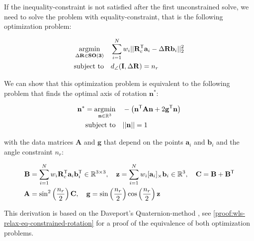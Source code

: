 If the inequality-constraint is not satisfied after the first unconstrained solve, we need to solve the problem with equality-constraint, that is the following optimization problem: 

\begin{equation}
	\label{eq:tls-rwls-eq}
	\begin{aligned}
		\operatorname*{argmin}_{\Delta \mathbf{R} \in \mathbf{SO(3)}}  \quad &\sum_{i=1}^{N} w_i ||\mathbf{R}_c^{\mathsf{T}} \mathbf{a}_i - \Delta\mathbf{R} \mathbf{b}_i ||_2^2 \\
		\text{subject to} \quad &d_{\angle}(\mathbf{I}, \Delta\mathbf{R}) = n_r
	\end{aligned}
\end{equation}

We can show that this optimization problem is equivalent to the following problem that finds the optimal axis of rotation $\mathbf{n}^*$:

\begin{equation}
	\begin{aligned}
		\label{eq:eq-constrained-prob-ev}
		\mathbf{n}^* = \operatorname*{argmin}_{\mathbf{n} \in \mathbb{R}^3} \quad &-\left(\mathbf{n}^{\mathsf{T}} \mathbf{A} \mathbf{n} + 2 \mathbf{g}^{\mathsf{T}} \mathbf{n} \right)\\
		\text{subject to} \quad &|| \mathbf{n}|| = 1\\
	\end{aligned}
\end{equation}

with the data matrices $\mathbf{A}$ and $\mathbf{g}$ that depend on the points $\mathbf{a}_i$ and $\mathbf{b}_i$ and the angle constraint $n_r$:

\begin{equation}
	\label{eq:davenport-data-matrices}
	\begin{aligned}
		\mathbf{B} &= \sum_{i=1}^N w_i \mathbf{R}_c^{\mathsf{T}} \mathbf{a}_i\mathbf{b}_i^{\mathsf{T}} \in \mathbb{R}^{3 \times 3}, \quad
		\mathbf{z} = \sum_{i=1}^N w_i [\mathbf{a}_i]_{\times}\mathbf{b}_i \in \mathbb{R}^{3}, \quad \mathbf{C} = \mathbf{B} + \mathbf{B}^{\mathsf{T}}\\
		\mathbf{A} &= \sin^2 \left(\frac{n_r}{2} \right) \mathbf{C}, \quad \mathbf{g} =  \sin \left(\frac{n_r}{2} \right) \cos \left(\frac{n_r}{2} \right) \mathbf{z}
	\end{aligned}
\end{equation}

This derivation is based on the Daveport's Quaternion-method \cite{davenportsQ} \cite{8594296}, see \ref{proof:wls-relax-eq-constrained-rotation} for a proof of the equivalence of both optimization problems.

